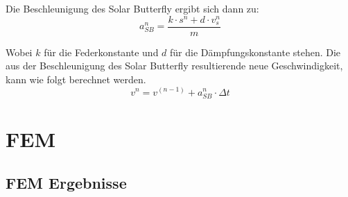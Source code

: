   Die Beschleunigung des Solar Butterfly ergibt sich dann zu:\\
  \begin{equation}
    a_{SB}^n = \frac{k \cdot s^n + d \cdot v_s^n}{m}
  \end{equation}

  Wobei $k$ für die Federkonstante und $d$ für die Dämpfungskonstante stehen.
  Die aus der Beschleunigung des Solar Butterfly resultierende neue Geschwindigkeit, kann wie folgt berechnet werden.
  \begin{equation}
    v^n = v^{(n-1)} + a_{SB}^n \cdot \Delta t
  \end{equation}


\newpage
\section{FEM}
\subsection{FEM Ergebnisse}
  \label{FEM Ergebnisse}

